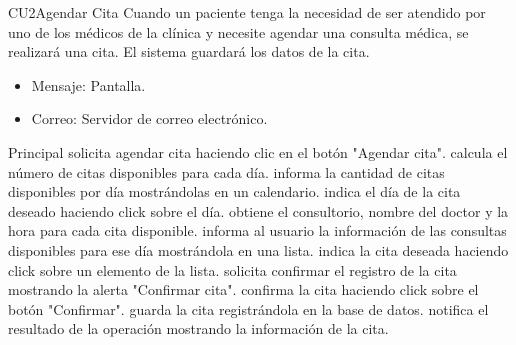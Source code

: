 \begin{UseCase}{CU2}{Agendar Cita
}{Cuando un paciente tenga la necesidad de ser atendido por uno de los médicos de la clínica y necesite agendar una consulta médica, se realizará una cita. El sistema guardará los datos de la cita.
}
{    \begin{itemize}
		\item Mensaje: Pantalla.
		\item Correo: Servidor de correo electrónico.
	\end{itemize}
    }


\end{UseCase}
\begin{UCtrayectoria}{Principal}
	\UCpaso[\UCactor] solicita agendar cita haciendo clic en el botón "Agendar cita".
	\UCpaso calcula el número de citas disponibles para cada día.
	\UCpaso informa la cantidad de citas disponibles por día mostrándolas en un calendario.
	\UCpaso[\UCactor] indica el día de la cita deseado haciendo click sobre el día.
	\UCpaso obtiene el consultorio, nombre del doctor y la hora para cada cita disponible.
	\UCpaso informa al usuario la información de las consultas disponibles para ese día mostrándola en una lista.
	\UCpaso[\UCactor] indica la cita deseada haciendo click sobre un elemento de la lista.
	\UCpaso solicita confirmar el registro de la cita mostrando la alerta "Confirmar cita".
	\UCpaso[\UCactor] confirma la cita haciendo click sobre el botón "Confirmar".
	\UCpaso guarda la cita registrándola en la base de datos.
	\UCpaso notifica el resultado de la operación mostrando la información de la cita.
\end{UCtrayectoria}
